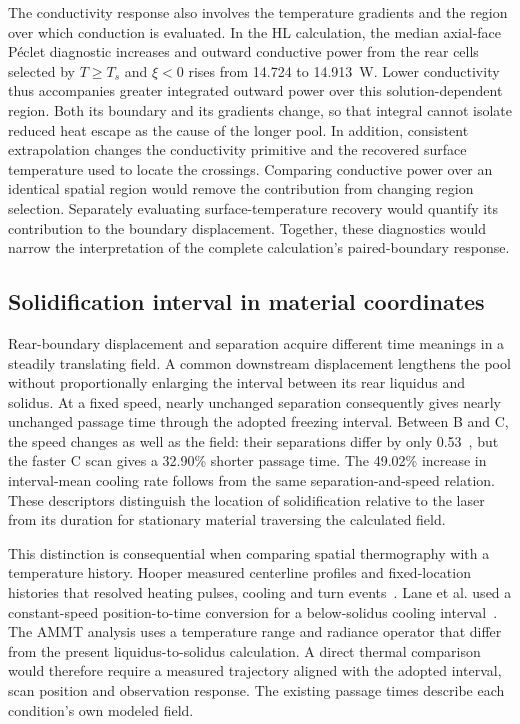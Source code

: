 The conductivity response also involves the temperature gradients and the region over which conduction is evaluated. In the HL calculation, the median axial-face P\'eclet diagnostic increases and outward conductive power from the rear cells selected by $T\geq T_s$ and $\xi<0$ rises from 14.724 to 14.913~W. Lower conductivity thus accompanies greater integrated outward power over this solution-dependent region. Both its boundary and its gradients change, so that integral cannot isolate reduced heat escape as the cause of the longer pool. In addition, consistent extrapolation changes the conductivity primitive and the recovered surface temperature used to locate the crossings. Comparing conductive power over an identical spatial region would remove the contribution from changing region selection. Separately evaluating surface-temperature recovery would quantify its contribution to the boundary displacement. Together, these diagnostics would narrow the interpretation of the complete calculation's paired-boundary response.

\subsection{Solidification interval in material coordinates}
Rear-boundary displacement and separation acquire different time meanings in a steadily translating field. A common downstream displacement lengthens the pool without proportionally enlarging the interval between its rear liquidus and solidus. At a fixed speed, nearly unchanged separation consequently gives nearly unchanged passage time through the adopted freezing interval. Between B and C, the speed changes as well as the field: their separations differ by only 0.53~\um{}, but the faster C scan gives a 32.90\% shorter passage time. The 49.02\% increase in interval-mean cooling rate follows from the same separation-and-speed relation. These descriptors distinguish the location of solidification relative to the laser from its duration for stationary material traversing the calculated field.

This distinction is consequential when comparing spatial thermography with a temperature history. Hooper measured centerline profiles and fixed-location histories that resolved heating pulses, cooling and turn events~\cite{hooper2018}. Lane et al. used a constant-speed position-to-time conversion for a below-solidus cooling interval~\cite{lane2020}. The AMMT analysis uses a temperature range and radiance operator that differ from the present liquidus-to-solidus calculation. A direct thermal comparison would therefore require a measured trajectory aligned with the adopted interval, scan position and observation response. The existing passage times describe each condition's own modeled field.

